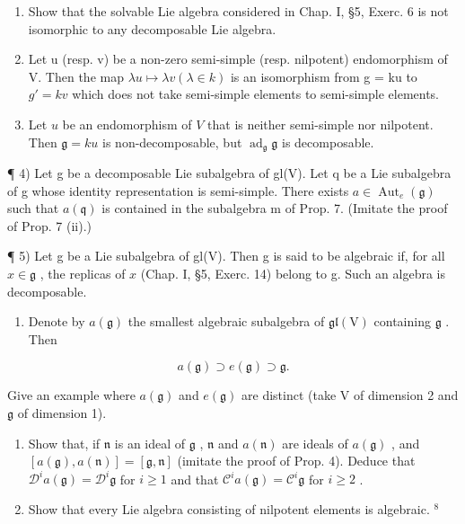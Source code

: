 
\begin{enumerate}
\def\labelenumi{\arabic{enumi})}
\item
  Show that the solvable Lie algebra considered in Chap. I, §5, Exerc. 6 is not isomorphic to any decomposable Lie algebra.
\item
  Let u (resp. v) be a non-zero semi-simple (resp. nilpotent) endomorphism of V. Then the map \(\lambda u \mapsto \lambda v (\lambda \in k)\) is an isomorphism from g = ku to \(g' = kv\) which does not take semi-simple elements to semi-simple elements.
\item
  Let \(u\) be an endomorphism of \(V\) that is neither semi-simple nor nilpotent. Then \(\mathfrak{g} = ku\) is non-decomposable, but \(\operatorname{ad}_{\mathfrak{g}}\mathfrak{g}\) is decomposable.
\end{enumerate}

¶ 4) Let g be a decomposable Lie subalgebra of gl(V). Let q be a Lie subalgebra of g whose identity representation is semi-simple. There exists \(a \in \operatorname{Aut}_{e}(\mathfrak{g})\) such that \(a(\mathfrak{q})\) is contained in the subalgebra m of Prop. 7. (Imitate the proof of Prop. 7 (ii).)

¶ 5) Let g be a Lie subalgebra of gl(V). Then g is said to be algebraic if, for all \(x \in \mathfrak{g}\) , the replicas of \(x\) (Chap. I, §5, Exerc. 14) belong to g. Such an algebra is decomposable.

\begin{enumerate}
\def\labelenumi{\alph{enumi})}
\tightlist
\item
  Denote by \(a(\mathfrak{g})\) the smallest algebraic subalgebra of \(\mathfrak{gl}(\mathrm{V})\) containing \(\mathfrak{g}\) . Then
\end{enumerate}

\[
a (\mathfrak {g}) \supset e (\mathfrak {g}) \supset \mathfrak {g}.
\]

Give an example where \(a(\mathfrak{g})\) and \(e(\mathfrak{g})\) are distinct (take V of dimension 2 and \(\mathfrak{g}\) of dimension 1).

\begin{enumerate}
\def\labelenumi{\alph{enumi})}
\setcounter{enumi}{1}
\item
  Show that, if \(\mathfrak{n}\) is an ideal of \(\mathfrak{g}\) , \(\mathfrak{n}\) and \(a(\mathfrak{n})\) are ideals of \(a(\mathfrak{g})\) , and \([a(\mathfrak{g}), a(\mathfrak{n})] = [\mathfrak{g}, \mathfrak{n}]\) (imitate the proof of Prop. 4). Deduce that \(\mathcal{D}^i a(\mathfrak{g}) = \mathcal{D}^i \mathfrak{g}\) for \(i \geq 1\) and that \(\mathcal{C}^i a(\mathfrak{g}) = \mathcal{C}^i \mathfrak{g}\) for \(i \geq 2\) .
\item
  Show that every Lie algebra consisting of nilpotent elements is algebraic. \(^{8}\)
\end{enumerate}

